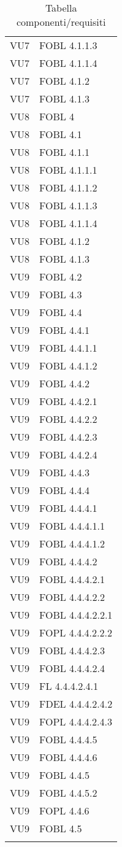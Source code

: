 \begin{longtable}{XX}
VU7&FOBL 4.1.1.3\\ 
VU7&FOBL 4.1.1.4\\ 
VU7&FOBL 4.1.2\\ 
VU7&FOBL 4.1.3\\ 
\midrule 
VU8&FOBL 4\\ 
VU8&FOBL 4.1\\ 
VU8&FOBL 4.1.1\\ 
VU8&FOBL 4.1.1.1\\ 
VU8&FOBL 4.1.1.2\\ 
VU8&FOBL 4.1.1.3\\ 
VU8&FOBL 4.1.1.4\\ 
VU8&FOBL 4.1.2\\ 
VU8&FOBL 4.1.3\\ 
\midrule 
VU9&FOBL 4.2\\ 
VU9&FOBL 4.3\\ 
VU9&FOBL 4.4\\ 
VU9&FOBL 4.4.1\\ 
VU9&FOBL 4.4.1.1\\ 
VU9&FOBL 4.4.1.2\\ 
VU9&FOBL 4.4.2\\ 
VU9&FOBL 4.4.2.1\\ 
VU9&FOBL 4.4.2.2\\ 
VU9&FOBL 4.4.2.3\\ 
VU9&FOBL 4.4.2.4\\ 
VU9&FOBL 4.4.3\\ 
VU9&FOBL 4.4.4\\ 
VU9&FOBL 4.4.4.1\\ 
VU9&FOBL 4.4.4.1.1\\ 
VU9&FOBL 4.4.4.1.2\\ 
VU9&FOBL 4.4.4.2\\ 
VU9&FOBL 4.4.4.2.1\\ 
VU9&FOBL 4.4.4.2.2\\ 
VU9&FOBL 4.4.4.2.2.1\\ 
VU9&FOPL 4.4.4.2.2.2\\ 
VU9&FOBL 4.4.4.2.3\\ 
VU9&FOBL 4.4.4.2.4\\ 
VU9&FL 4.4.4.2.4.1\\ 
VU9&FDEL 4.4.4.2.4.2\\ 
VU9&FOPL 4.4.4.2.4.3\\ 
VU9&FOBL 4.4.4.5\\ 
VU9&FOBL 4.4.4.6\\ 
VU9&FOBL 4.4.5\\ 
VU9&FOBL 4.4.5.2\\ 
VU9&FOPL 4.4.6\\ 
VU9&FOBL 4.5\\ 
\midrule 
\bottomrule
\caption{Tabella componenti/requisiti}
\end{longtable} 
